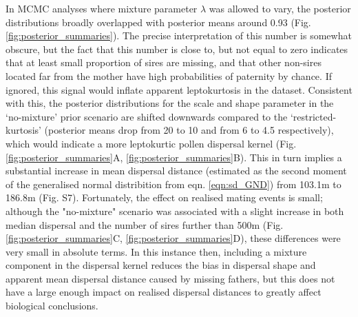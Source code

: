 \documentclass[10pt, a4paper, twocolumn]{article} %
\begin{document}
In MCMC analyses where mixture parameter $\lambda$ was allowed to vary, the posterior distributions broadly overlapped with posterior means around 0.93 (Fig. \ref{fig:posterior_summaries}).
The precise interpretation of this number is somewhat obscure, but the fact that this number is close to, but not equal to zero indicates that at least small proportion of sires are missing, and that other non-sires located far from the mother have high probabilities of paternity by chance.
If ignored, this signal would inflate apparent leptokurtosis in the dataset.
Consistent with this, the posterior distributions for the scale and shape parameter in the ‘no-mixture’ prior scenario are shifted downwards compared to the ‘restricted-kurtosis’ (posterior means drop from 20 to 10 and from 6 to 4.5 respectively), which would indicate a more leptokurtic pollen dispersal kernel (Fig. \ref{fig:posterior_summaries}A, \ref{fig:posterior_summaries}B).
This in turn implies a substantial increase in mean dispersal distance (estimated as the second moment of the generalised normal distribition from eqn. \ref{eqn:sd_GND}) from 103.1m to 186.8m (Fig. S7).
Fortunately, the effect on realised mating events is small; although the "no-mixture" scenario was associated with a slight increase in both median dispersal and the number of sires further than 500m (Fig. \ref{fig:posterior_summaries}C, \ref{fig:posterior_summaries}D), these differences were very small in absolute terms.
In this instance then, including a mixture component in the dispersal kernel reduces the bias in dispersal shape and apparent mean dispersal distance caused by missing fathers, but this does not have a large enough impact on realised dispersal distances to greatly affect biological conclusions.


\end{document}
